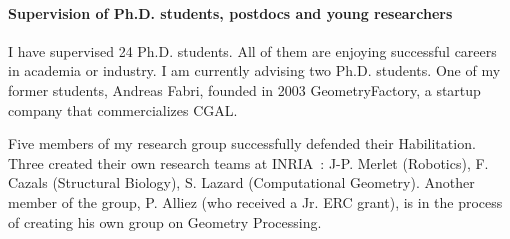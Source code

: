 


\paragraph{Supervision of Ph.D. students, postdocs and young researchers} \mbox{}

I have supervised 24 Ph.D. students. All of them are enjoying successful careers in academia or industry. I am currently advising two Ph.D. students. One of my former students, Andreas Fabri, founded in 2003 GeometryFactory, a startup company that commercializes CGAL.

Five members of my research group successfully defended their Habilitation.  Three created their own research teams at INRIA~: J-P. Merlet (Robotics), F. Cazals (Structural Biology), S. Lazard (Computational Geometry). Another member of the group, P. Alliez (who received a Jr. ERC grant), is in the process of creating his own group on Geometry Processing.



